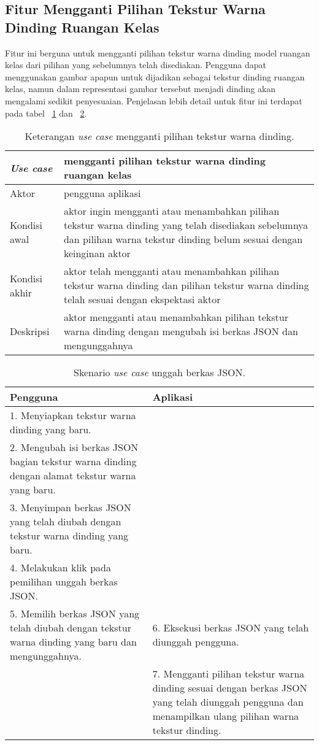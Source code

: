 \subsection{Fitur Mengganti Pilihan Tekstur Warna Dinding Ruangan Kelas}
Fitur ini berguna untuk mengganti pilihan tekstur warna dinding model ruangan kelas dari pilihan yang sebelumnya telah disediakan. Pengguna dapat menggunakan gambar apapun untuk dijadikan sebagai tekstur dinding ruangan kelas, namun dalam representasi gambar tersebut menjadi dinding akan mengalami sedikit penyesuaian. Penjelasan lebih detail untuk fitur ini terdapat pada tabel ~\ref{table:fiturpilihanteksturdinding1} dan ~\ref{table:fiturpilihanteksturdinding2}.
\begin{table}[H]
	\centering
	\begin{tabular}{| m{10em} | m{30em} |} 
	\hline
	\textbf{\textit{Use case}} & \textbf{mengganti pilihan tekstur warna dinding ruangan kelas} \\ 
	\hline
	Aktor & pengguna aplikasi  \\ 
	\hline
	Kondisi awal & aktor ingin mengganti atau menambahkan pilihan tekstur warna dinding yang telah disediakan sebelumnya dan pilihan warna tekstur dinding belum sesuai dengan keinginan aktor \\ 
	\hline
	Kondisi akhir & aktor telah mengganti atau menambahkan pilihan tekstur warna dinding dan pilihan tekstur warna dinding telah sesuai dengan ekspektasi aktor \\ 
 	\hline
	Deskripsi & aktor mengganti atau menambahkan pilihan tekstur warna dinding dengan mengubah isi berkas JSON dan mengunggahnya \\ 
 	\hline
	\end{tabular}
	\caption{Keterangan {\it use case} mengganti pilihan tekstur warna dinding.}
	\label{table:fiturpilihanteksturdinding1}
\end{table}

\begin{table}[H]
	\centering
	\begin{tabular}{| m{20em} | m{20em} |} 
	\hline
	\textbf{Pengguna} & \textbf{Aplikasi} \\ 
	\hline
	1. Menyiapkan tekstur warna dinding yang baru. &  \\ 
	\hline
	2. Mengubah isi berkas JSON bagian tekstur warna dinding dengan alamat tekstur warna yang baru. &  \\ 
	\hline
	3. Menyimpan berkas JSON yang telah diubah dengan tekstur warna dinding yang baru. &  \\ 
	\hline
	4. Melakukan klik pada pemilihan unggah berkas JSON. &  \\ 
	\hline
	5. Memilih berkas JSON yang telah diubah dengan tekstur warna dinding yang baru dan mengunggahnya. & 6. Eksekusi berkas JSON yang telah diunggah pengguna. \\ 
	\hline
	 & 7. Mengganti pilihan tekstur warna dinding sesuai dengan berkas JSON yang telah diunggah pengguna dan menampilkan ulang pilihan warna tekstur dinding. \\ 
 	\hline
	\end{tabular}
	\caption{Skenario {\it use case} unggah berkas JSON.}
	\label{table:fiturpilihanteksturdinding2}
\end{table}

